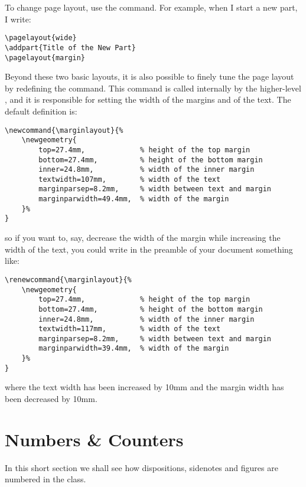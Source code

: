 
To change page layout, use the  command. For 
example, when I start a new part, I write:

\begin{lstlisting}
\pagelayout{wide}
\addpart{Title of the New Part}
\pagelayout{margin}
\end{lstlisting}

Beyond these two basic layouts, it is also possible to finely tune the 
page layout by redefining the  command. This 
command is called internally by the higher-level , 
and it is responsible for setting the width of the margins and of the 
text. The default definition is:

\begin{lstlisting}
\newcommand{\marginlayout}{%
	\newgeometry{
		top=27.4mm,				% height of the top margin
		bottom=27.4mm,			% height of the bottom margin
		inner=24.8mm,			% width of the inner margin
		textwidth=107mm,		% width of the text
		marginparsep=8.2mm,		% width between text and margin
		marginparwidth=49.4mm,	% width of the margin
	}%
}
\end{lstlisting}

so if you want to, say, decrease the width of the margin while 
increasing the width of the text, you could write in the preamble of 
your document something like:

\begin{lstlisting}
\renewcommand{\marginlayout}{%
	\newgeometry{
		top=27.4mm,				% height of the top margin
		bottom=27.4mm,			% height of the bottom margin
		inner=24.8mm,			% width of the inner margin
		textwidth=117mm,		% width of the text
		marginparsep=8.2mm,		% width between text and margin
		marginparwidth=39.4mm,	% width of the margin
	}%
}
\end{lstlisting}

where the text width has been increased by 10mm and the margin width has 
been decreased by 10mm.

\section{Numbers \& Counters}

In this short section we shall see how dispositions, sidenotes and 
figures are numbered in the  class.

